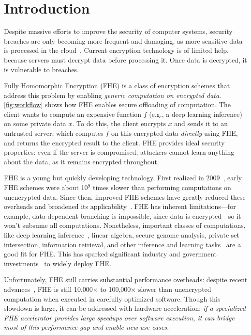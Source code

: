 \chapter{Introduction}\label{sec:intro}

Despite massive efforts to improve the security of computer systems, security
breaches are only becoming more frequent and damaging, as more sensitive data
is processed in the
cloud~\cite{malekos-smith:csis20:hidden-costs-cybercrime,ibm20:breach-cost-report}.
Current encryption technology is of limited help, because servers must decrypt
data before processing it. Once data is decrypted, it is vulnerable to
breaches.

\figWorkflow

Fully Homomorphic Encryption (FHE) is a class of encryption schemes that
address this problem by enabling \emph{generic computation on encrypted data}.
\autoref{fig:workflow} shows how FHE enables secure offloading of computation.
The client wants to compute an expensive function $f$ (e.g., a deep learning
inference) on some private data $x$. To do this, the client encrypts $x$ and
sends it to an untrusted server, which computes $f$ on this encrypted data
\emph{directly} using FHE, and returns the encrypted result to the client. FHE
provides ideal security properties: even if the server is compromised,
attackers cannot learn anything about the data, as it remains encrypted
throughout.


FHE is a young but quickly developing technology. First realized in
2009~\cite{gentry09}, early FHE schemes were about 10$^9$ times slower than
performing computations on unencrypted data. Since then, improved FHE schemes
have greatly reduced these overheads and broadened its
applicability~\cite{albrecht:hesg18:standard,peikert2016decade}. FHE has
inherent limitations---for example, data-dependent branching is impossible,
since data is encrypted---so it won't subsume all computations. Nonetheless,
important classes of computations, like deep learning
inference~\cite{cheon:ictaci17:homomorphic,dathathri:pldi19:chet,dathathri:pldi20:eva},
linear algebra, secure genome analysis, private set intersection, information
retrieval, and other inference and learning
tasks~\cite{kim2020semi,gilad:icml16:cryptonets,han:aaai19:logistic,han:iacr18:efficient,juvekar2018gazelle,DBLP:conf/ccs/ChenLR17,DBLP:conf/tcc/GentryH19}
are a good fit for FHE. This has sparked significant industry and government
investments~\cite{ibm,intel,dprive} to widely deploy FHE.

Unfortunately, FHE still carries substantial performance overheads: despite
recent advances~\cite{dathathri:pldi19:chet, dathathri:pldi20:eva,
roy:hpca19:fpga-he, brutzkus:icml19:low, polyakov:17:palisade}, FHE is still
10,000$\times$ to 100,000$\times$ slower than unencrypted computation when
executed in carefully optimized software. Though this slowdown is large, it can
be addressed with hardware acceleration: \emph{if a specialized FHE accelerator
provides large speedups over software execution, it can bridge most of this
performance gap and enable new use cases.}

